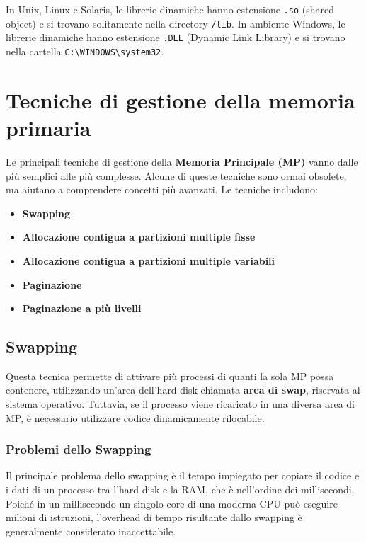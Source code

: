 In Unix, Linux e Solaris, le librerie dinamiche hanno estensione \texttt{.so} (shared object) e si trovano solitamente nella directory \texttt{/lib}. In ambiente Windows, le librerie dinamiche hanno estensione \texttt{.DLL} (Dynamic Link Library) e si trovano nella cartella \texttt{C:\textbackslash WINDOWS\textbackslash system32}.

\section{Tecniche di gestione della memoria primaria}
Le principali tecniche di gestione della \textbf{Memoria Principale (MP)} vanno dalle più semplici alle più complesse. Alcune di queste tecniche sono ormai obsolete, ma aiutano a comprendere concetti più avanzati. Le tecniche includono:

\begin{itemize}
    \item \textbf{Swapping}
    \item \textbf{Allocazione contigua a partizioni multiple fisse}
    \item \textbf{Allocazione contigua a partizioni multiple variabili}
    \item \textbf{Paginazione}
    \item \textbf{Paginazione a più livelli}
\end{itemize}

\subsection*{Swapping}


Questa tecnica permette di attivare più processi di quanti la sola MP possa contenere, utilizzando un'area dell'hard disk chiamata \textbf{area di swap}, riservata al sistema operativo. Tuttavia, se il processo viene ricaricato in una diversa area di MP, è necessario utilizzare codice dinamicamente rilocabile.

\subsubsection*{Problemi dello Swapping}

Il principale problema dello swapping è il tempo impiegato per copiare il codice e i dati di un processo tra l'hard disk e la RAM, che è nell'ordine dei millisecondi. Poiché in un millisecondo un singolo core di una moderna CPU può eseguire milioni di istruzioni, l'overhead di tempo risultante dallo swapping è generalmente considerato inaccettabile.

